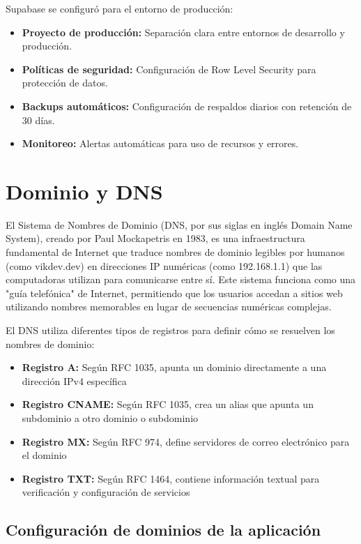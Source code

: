 \documentclass[12pt,a4paper]{report}
\begin{document}
Supabase se configuró para el entorno de producción:

\begin{itemize}
\item \textbf{Proyecto de producción:} Separación clara entre entornos de desarrollo y producción.
\item \textbf{Políticas de seguridad:} Configuración de Row Level Security para protección de datos.
\item \textbf{Backups automáticos:} Configuración de respaldos diarios con retención de 30 días.
\item \textbf{Monitoreo:} Alertas automáticas para uso de recursos y errores.
\end{itemize}

\section{Dominio y DNS}

El Sistema de Nombres de Dominio (DNS, por sus siglas en inglés Domain Name System), creado por Paul Mockapetris en 1983, es una infraestructura fundamental de Internet que traduce nombres de dominio legibles por humanos (como vikdev.dev) en direcciones IP numéricas (como 192.168.1.1) que las computadoras utilizan para comunicarse entre sí. Este sistema funciona como una "guía telefónica" de Internet, permitiendo que los usuarios accedan a sitios web utilizando nombres memorables en lugar de secuencias numéricas complejas.

El DNS utiliza diferentes tipos de registros para definir cómo se resuelven los nombres de dominio:
\begin{itemize}
\item \textbf{Registro A:} Según RFC 1035, apunta un dominio directamente a una dirección IPv4 específica
\item \textbf{Registro CNAME:} Según RFC 1035, crea un alias que apunta un subdominio a otro dominio o subdominio
\item \textbf{Registro MX:} Según RFC 974, define servidores de correo electrónico para el dominio
\item \textbf{Registro TXT:} Según RFC 1464, contiene información textual para verificación y configuración de servicios
\end{itemize}

\subsection{Configuración de dominios de la aplicación}
\end{document}
